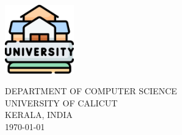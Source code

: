 \documentclass[
11pt, %
english, %
onehalfspacing, %
nolistspacing, %
liststotoc, %
toctotoc, %
headsepline, %
]{MastersDoctoralThesis} %
\theoremstyle{definition}
\begin{document}
\begin{titlepage}
\begin{center}
\vspace*{.03\textheight}
\begin{center}
    \includegraphics[width=3cm,height=3cm]{Figures/cu_logo.jpg}
\end{center}
\vspace*{.02\textheight}
DEPARTMENT OF COMPUTER SCIENCE
\\
UNIVERSITY OF CALICUT 
\\
KERALA, INDIA 
\vspace*{.02\textheight} \\
\today
\end{center}
\end{titlepage}

\cleardoublepage

\end{document}
